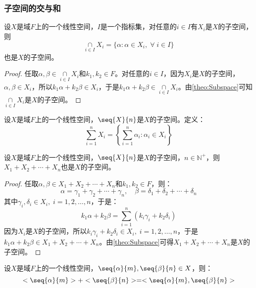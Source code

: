 \subsubsection{子空间的交与和}
\begin{theorem}\label{theo:CapSubspace}
	设$X$是域$F$上的一个线性空间，$I$是一个指标集，对任意的$i\in I$有$X_i$是$X$的子空间，则
	\begin{equation*}
		\underset{i\in I}{\overset{}{\cap}}X_i=\{\alpha:\alpha\in X_i,\;\forall\;i\in I\}
	\end{equation*}
	也是$X$的子空间。
\end{theorem}
\begin{proof}
	任取$\alpha,\beta\in\underset{i\in I}{\overset{}{\cap}}X_i$和$k_1,k_2\in F$。对任意的$i\in I$，因为$X_i$是$X$的子空间，$\alpha,\beta\in X_i$，所以$k_1\alpha+k_2\beta\in X_i$，于是$k_1\alpha+k_2\beta\in\underset{i\in I}{\overset{}{\cap}}X_i$。由\cref{theo:Subspace}可知$\underset{i\in I}{\overset{}{\cap}}X_i$是$X$的子空间。
\end{proof}
\begin{definition}
	设$X$是域$F$上的一个线性空间，$\seq{X}{n}$是$X$的子空间。定义：
	\begin{equation*}
		\sum_{i=1}^{n}X_i=\left\{\sum_{i=1}^{n}\alpha_i:\alpha_i\in X_i\right\}
	\end{equation*}
\end{definition}
\begin{theorem}\label{theo:DierectSumSubspace}
	设$X$是域$F$上的一个线性空间，$\seq{X}{n}$是$X$的子空间，$n\in\mathbb{N}^+$，则$X_1+X_2+\cdots+X_n$也是$X$的子空间。
\end{theorem}
\begin{proof}
	任取$\alpha,\beta\in X_1+X_2+\cdots+X_n$和$k_1,k_2\in F$，则：
	\begin{equation*}
		\alpha=\gamma_1+\gamma_2+\cdots+\gamma_n,\quad
		\beta=\delta_1+\delta_2+\cdots+\delta_n
	\end{equation*}
	其中$\gamma_i,\delta_i\in X_i,\;i=1,2,\dots,n$，于是：
	\begin{equation*}
		k_1\alpha+k_2\beta=\sum_{i=1}^{n}(k_i\gamma_i+k_2\delta_i)
	\end{equation*}
	因为$X_i$是$X$的子空间，所以$k_i\gamma_i+k_2\delta_i\in X_i,\;i=1,2,\dots,n$，于是$k_1\alpha+k_2\beta\in X_1+X_2+\cdots+X_n$。由\cref{theo:Subspace}可得$X_1+X_2+\cdots+X_n$是$X$的子空间。
\end{proof}
\begin{lemma}\label{lem:SubspaceSumalpha}
	设$X$是域$F$上的一个线性空间，$\seq{\alpha}{m},\seq{\beta}{n}\in X$，则：
	\begin{equation*}
		<\seq{\alpha}{m}>+<\seq{\beta}{n}>=<\seq{\alpha}{m},\seq{\beta}{n}>
	\end{equation*}
\end{lemma}
